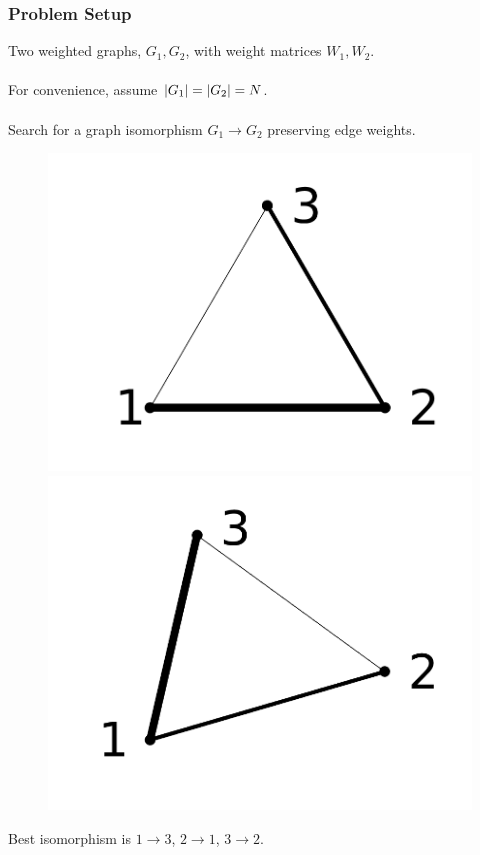 \documentclass{beamer}
\begin{document}
\begin{frame}
  \frametitle{Problem Setup}
  Two weighted graphs, $G_1,G_2$, with weight matrices $W_1,W_2$.\\~\\
  For convenience, assume $\left\lvert G_1\right\rvert = \left\lvert G_2\right\rvert = N$.\\~\\
  Search for a graph isomorphism $G_1\to G_2$ preserving edge weights.
  \begin{figure}[ht]
    \centering
    \begin{minipage}[b]{0.40\linewidth}
      \centering
      \includegraphics[width=\textwidth]{./Images/GraphMatch/isom1.png}
    \end{minipage}
    \begin{minipage}[b]{0.40\linewidth}
      \centering
      \includegraphics[width=\textwidth]{./Images/GraphMatch/isom2.png}
    \end{minipage}
  \end{figure}
  Best isomorphism is $1 \to 3$, $2 \to 1$, $3 \to 2$.
\end{frame}
\end{document}

